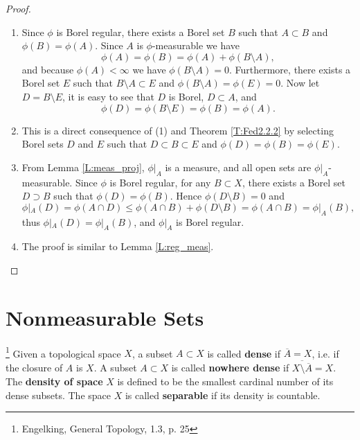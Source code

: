 \begin{proof}  %
\begin{enumerate}
\item[(1)] Since $\phi$ is Borel regular, there exists a Borel set $B$ such that
$A\subset B$ and $\phi(B)=\phi(A)$. Since $A$ is $\phi$-measurable 
we have
\[
  \phi(A)=\phi(B)=\phi(A)+\phi(B\setminus A),
\]
and because $\phi(A)<\infty$ we have $\phi(B\setminus A)=0$.
Furthermore, there exists a Borel set $E$
such that $B\setminus A \subset E$ and $\phi(B\setminus A)=\phi(E)=0$.
Now let $D=B\setminus E$, it is easy to see that $D$ is Borel, $D\subset A$, 
and 
\[
  \phi(D)=\phi(B\setminus E)=\phi(B)=\phi(A).
\]

\item[(2)] This is a direct consequence of (1) and Theorem \ref{T:Fed2.2.2} by 
selecting Borel sets $D$ and $E$ such that $D\subset B\subset E$ and
$\phi(D)=\phi(B)=\phi(E)$.

\item[(3)] From Lemma \ref{L:meas_proj}, $\phi|_A$ is a measure, and all open 
sets are $\phi|_A$-measurable. Since $\phi$ is Borel regular, for any 
$B\subset X$, there exists a Borel set $D\supset B$ such that $\phi(D)=\phi(B)$.
Hence $\phi(D\setminus B)=0$ and
\[
  \phi|_A(D) = \phi(A\cap D) \leq \phi(A\cap B) + \phi(D\setminus B) 
    = \phi(A\cap B) = \phi|_A(B),
\]
thus $\phi|_A(D)=\phi|_A(B)$, and $\phi|_A$ is Borel regular.

\item[(4)] The proof is similar to Lemma \ref{L:reg_meas}.

\end{enumerate}
\end{proof}   %


\section{Nonmeasurable Sets}

\begin{definition} \label{D:dense}
\footnote{Engelking, General Topology, 1.3, p. 25}
Given a topological space $X$, a subset $A\subset X$ is called \textbf{dense}
if $\overline{A}=X$, i.e. if the closure of $A$ is $X$. 
A subset $A\subset X$ is called \textbf{nowhere dense} 
if $\overline{X\setminus \overline{A}}=X$.
The \textbf{density of space} $X$ is defined to be the
smallest cardinal number of its dense subsets. The space $X$ is called
\textbf{separable} 
if its density is countable.
\end{definition}

